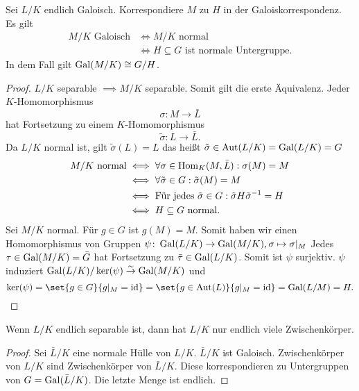 \begin{Satz}
    Sei $L/K$ endlich Galoisch. Korrespondiere $M$ zu $H$ in der Galoiskorrespondenz.
    Es gilt 
    \begin{align*}
        M/K \text{ Galoisch}&\iff M/K \text{ normal}\\
        & \iff H\subseteq G \text{ ist normale Untergruppe.}
    \end{align*} In dem Fall gilt $\operatorname{Gal}(M/K)\cong G/H$.
\end{Satz}
\begin{proof}
    $L/K$ separable $\implies M/K$ separable. Somit gilt die erste Äquivalenz.
    Jeder $K$-Homomorphismus $$\sigma\colon M\to \bar L$$ hat Fortsetzung zu einem $K$-Homomorphismus $$\tilde\sigma\colon L\to\bar L .$$  Da $L/K$ normal ist, gilt $\tilde\sigma(L)=L$ das heißt $\tilde\sigma\in\operatorname{Aut}(L/K)=\operatorname{Gal}(L/K)=G$
    \begin{align*}
        M/K \text{ normal}&\iff \forall\sigma\in\operatorname{Hom}_K(M,\bar L): \sigma(M)=M\\
        & \iff \forall\tilde\sigma\in G: \tilde\sigma(M)=M\\
        &\iff \text{Für jedes } \tilde \sigma\in G: \tilde\sigma H\tilde\sigma^{-1}=H\\
        &\iff H\subseteq G \text{ normal.}
    \end{align*}
    Sei $M/K$ normal. Für $g\in G$ ist $g(M)=M$. Somit haben wir einen Homomorphismus von Gruppen 
    $\psi\colon \operatorname{Gal}(L/K)\to\operatorname{Gal}(M/K), \sigma\mapsto \sigma|_M$
    Jedes $\tau\in\operatorname{Gal}(M/K)=\bar G$ hat Fortsetzung zu $\bar\tau\in\operatorname{Gal}(L/K)$. Somit ist $\psi$ surjektiv. $\psi$ induziert $\operatorname{Gal}(L/K)/\ker(\psi)\stackrel{\sim}{\to}\operatorname{Gal}(M/K)$ und 
    $$\Ker(\psi)=\set{g\in G}{ g|_M=\id}=\set{g\in\Aut(L)}{ g|_M=\id}=\Gal(L/M)=H.$$
\end{proof}
\begin{Kor}\label{Kor:SepZwischen}
    Wenn $L/K$ endlich separable ist, dann hat $L/K$ nur endlich viele Zwischenkörper.
\end{Kor}
\begin{proof}
    Sei $\bar L/K$ eine normale Hülle von $L/K$. $\bar L/K$ ist Galoisch. Zwischenkörper von $L/K$ sind Zwischenkörper von $\bar L/K$. Diese korrespondieren zu Untergruppen von $G=\operatorname{Gal}(\bar L/K)$. Die letzte Menge ist endlich.
\end{proof}
